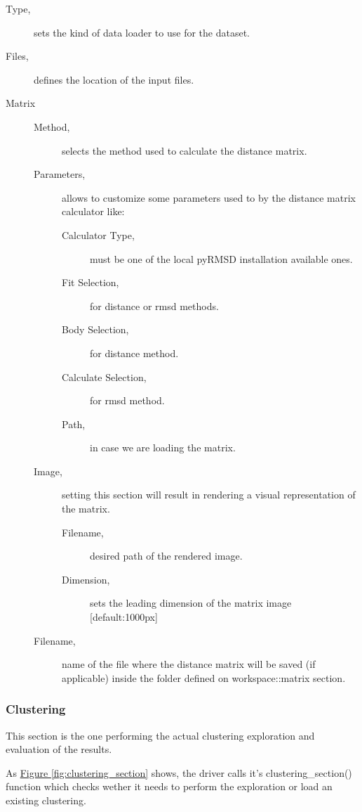 \begin{description}
\item [Type, ] sets the kind of data loader to use for the dataset.
\item [Files,] defines the location of the input files.
\item [Matrix] \hfil
\begin{description}
\item [Method,] selects the method used to calculate the distance matrix.
\item [Parameters,] allows to customize some parameters used to by the distance matrix calculator like:
\begin{description}
\item [Calculator Type,] must be one of the local pyRMSD installation available ones.
\item [Fit Selection,] for distance or rmsd methods.
\item [Body Selection,] for distance method.
\item [Calculate Selection,] for rmsd method.
\item [Path,] in case we are loading the matrix.
\end{description}
\item [Image,] setting this section will result in rendering a visual representation of the matrix.
\begin{description}
\item [Filename,] desired path of the rendered image.
\item [Dimension,] sets the leading dimension of the matrix image [default:1000px]
\end{description}
\item [Filename,] name of the file where the distance matrix will be saved (if applicable) inside the folder defined on workspace::matrix section. 
\end{description}
\end{description}


\subsubsection{Clustering}

This section is the one performing the actual clustering exploration and evaluation of the results. 

As \hyperref[fig:clustering_section]{Figure \ref{fig:clustering_section}} shows, the driver calls it's clustering\_section() function which checks wether it needs to perform the exploration or load an existing clustering. 

